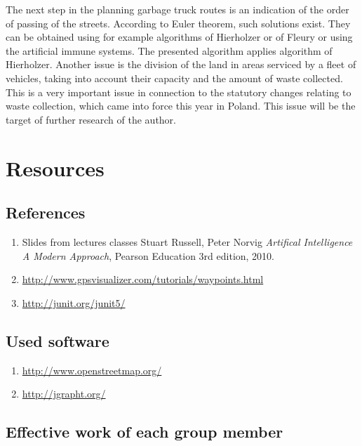 \documentclass[a4paper]{article}
\begin{document}
The next step in the planning garbage truck routes is an indication of the order of passing of
the streets. According to Euler theorem, such solutions exist. They can be obtained using for example
algorithms of Hierholzer or of Fleury or using the artificial immune systems. The presented algorithm
applies algorithm of Hierholzer.
Another issue is the division of the land in areas serviced by a fleet of vehicles, taking into account
their capacity and the amount of waste collected. This is a very important issue in connection to
the statutory changes relating to waste collection, which came into force this year in Poland. This issue
will be the target of further research of the author.

\newpage

\section{Resources}

\subsection{References}

\begin{enumerate}
	
	\item Slides from lectures classes
	Stuart Russell, Peter Norvig
	\emph{Artifical Intelligence A Modern Approach},
	Pearson Education
	3rd edition,
	2010.
	\item \url{http://www.gpsvisualizer.com/tutorials/waypoints.html} 
	\item \url{http://junit.org/junit5/}
	

\end{enumerate}

\subsection{Used software} \label{openStreet}
\begin{enumerate}
	
\item \url{http://www.openstreetmap.org/}\label{itm:openStreet}
\item \url{http://jgrapht.org/}

\end{enumerate}

\subsection{Effective work of each group member}
\end{document}
